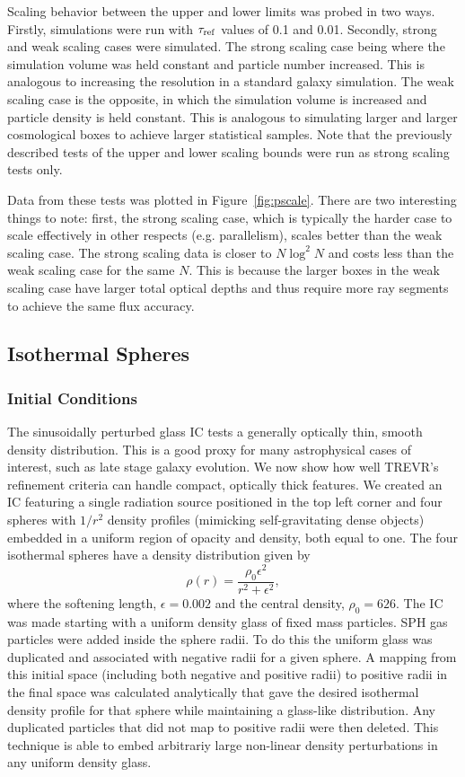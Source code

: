 \documentclass[fleq,usenatbib]{mnras}
\newcommand{\acro}{TREVR}
\newcommand{\tr}{\tau_{\rm ref}}
\begin{document}
{Scaling behavior between the upper and lower limits was probed in two ways. 
Firstly, simulations were run with $\tr$ values of 0.1 and 0.01. Secondly, 
strong and weak scaling cases were simulated. The strong scaling case being 
where the simulation volume was held constant and particle number increased. 
This is analogous to increasing the resolution in a standard galaxy 
simulation. The weak scaling case is the opposite, in which the simulation 
volume is increased and particle density is held constant. This is analogous 
to simulating larger and larger cosmological boxes to achieve larger 
statistical samples. Note that the previously described tests of the upper and 
lower scaling bounds were run as strong scaling tests only.

Data from these tests was plotted in Figure~\ref{fig:pscale}. 
There are two interesting things to note: first, the strong scaling case, 
which is typically the harder case to scale effectively in other respects (e.g. parallelism),
scales better than 
the weak scaling case.  The strong scaling data is closer to
$N\log^2{N}$ and costs less than the weak scaling case for the same $N$. This is 
because the larger boxes in the weak scaling case have larger total
optical depths and thus require more ray segments to achieve the same flux accuracy.

\subsection{Isothermal Spheres}\label{spheretest}
\subsubsection{Initial Conditions}
The sinusoidally perturbed glass IC tests a generally optically thin, smooth 
density distribution. This is a good proxy for many astrophysical cases of 
interest, such as late stage galaxy evolution.  We now show how well \acro{}'s 
refinement criteria can handle compact, optically thick features.   We created 
an IC featuring a single radiation source positioned in the top left corner 
and four spheres with $1/r^2$ density profiles (mimicking self-gravitating dense objects)
embedded in a uniform region of opacity and density, both equal to one.
The four isothermal spheres have a 
density distribution given by
\begin{equation}
\rho(r) = \frac{\rho_0 \epsilon^2}{r^2 + \epsilon^2},
\end{equation}
where the softening length, $\epsilon=0.002$ and the central density, 
$\rho_0=626$.  The IC was made starting with a uniform density glass of fixed mass particles.
SPH gas particles were added inside the sphere radii.
To do this the uniform glass was duplicated and associated with negative radii for a given sphere.
A mapping from this initial space (including both negative and positive radii) to positive
radii in the final space was calculated analytically
that gave the desired isothermal density profile for that sphere
while maintaining a glass-like distribution.
Any duplicated particles that did not map to positive radii were then deleted.
This technique is able to embed arbitrariy large non-linear density
perturbations in any uniform density glass.

}
\end{document}
